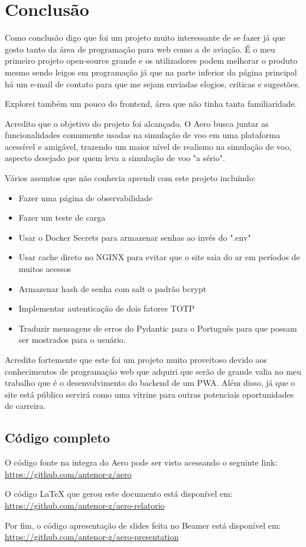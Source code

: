 \chapter{Conclusão}

Como conclusão digo que foi um projeto muito interessante de se fazer já que 
gosto tanto da área de programação para web como a de aviação. É o meu primeiro 
projeto open-source grande e os utilizadores podem melhorar o produto mesmo sendo
leigos em programação já que na parte inferior da página principal há um e-mail 
de contato para que me sejam enviadas elogios, críticas e sugestões.

Explorei também um pouco do frontend, área que não tinha tanta familiaridade.

Acredito que o objetivo do projeto foi alcançado. O Aero busca juntar as funcionalidades 
comumente usadas na simulação de voo em uma plataforma acessível e amigável, 
trazendo um maior nível de realismo na simulação de voo, aspecto desejado por quem leva
a simulação de voo "a sério".

Vários assuntos que não conhecia aprendi com este projeto incluindo:

\begin{itemize}
\item Fazer uma página de observabilidade
\item Fazer um teste de carga
\item Usar o Docker Secrets para armazenar senhas ao invés do ".env"
\item Usar cache direto no NGINX para evitar que o site saia do ar em períodos 
de muitos acessos
\item Armazenar hash de senha com salt o padrão bcrypt
\item Implementar autenticação de dois fatores TOTP
\item Traduzir mensagens de erros do Pydantic para o Português para que possam 
ser mostrados para o usuário.
\end{itemize}

Acredito fortemente que este foi um projeto muito proveitoso devido aos 
conhecimentos de programação web que adquiri que serão de grande valia no meu 
trabalho que é o desenvolvimento do backend de um PWA. Além disso, já que o site está público 
servirá como uma vitrine para outras potenciais oportunidades de carreira.

\section {Código completo}

O código fonte na integra do Aero pode ser visto acessando o seguinte link: \url{https://github.com/antenor-z/aero}

O código LaTeX que gerou este documento está disponível em: \url{https://github.com/antenor-z/aero-relatorio}

Por fim, o código apresentação de slides feita no Beamer está disponível em: \url{https://github.com/antenor-z/aero-presentation}